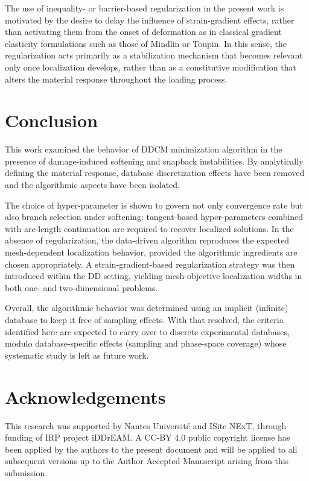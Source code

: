 \documentclass[10pt]{cas-sc}
\begin{document}
The use of inequality- or barrier-based regularization in the present work is motivated by the desire to delay the influence of strain-gradient effects, rather than activating them from the onset of deformation as in classical gradient elasticity formulations such as those of Mindlin or Toupin. In this sense, the regularization acts primarily as a stabilization mechanism that becomes relevant only once localization develops, rather than as a constitutive modification that alters the material response throughout the loading process.


\section{Conclusion}

This work examined the behavior of DDCM minimization algorithm in the presence of damage-induced softening and snapback instabilities. By analytically defining the material response, database discretization effects have been removed and the algorithmic aspects have been isolated.

The choice of hyper-parameter is shown to govern not only convergence rate but also branch selection under softening; tangent-based hyper-parameters combined with arc-length continuation are required to recover localized solutions. In the absence of regularization, the data-driven algorithm reproduces the expected mesh-dependent localization behavior, provided the algorithmic ingredients are chosen appropriately. A strain-gradient-based regularization strategy was then introduced within the DD setting, yielding mesh-objective localization widths in both one- and two-dimensional problems.

Overall, the algorithmic behavior was determined using an implicit (infinite) database to keep it free of sampling effects. With that resolved, the criteria identified here are expected to carry over to discrete experimental databases, modulo database-specific effects (sampling and phase-space coverage) whose systematic study is left as future work.

\section*{Acknowledgements} 
This research was supported by Nantes Université and ISite NExT, through funding of IRP project iDDrEAM. A CC-BY 4.0 public copyright license has been applied by the authors to the present document and will be applied to all subsequent versions up to the Author Accepted Manuscript arising from this submission.
\end{document}
